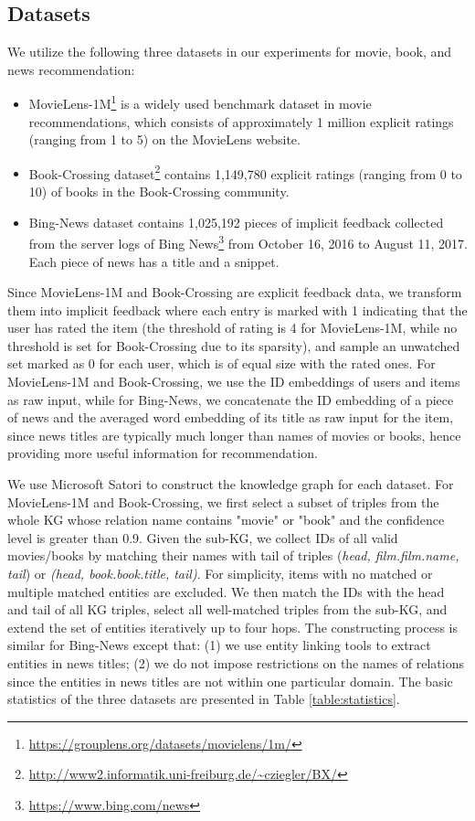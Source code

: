 \documentclass[sigconf]{acmart}
\begin{document}
	
	\subsection{Datasets}
		We utilize the following three datasets in our experiments for movie, book, and news recommendation:
		\begin{itemize}
			\item
				MovieLens-1M\footnote{\url{https://grouplens.org/datasets/movielens/1m/}} is a widely used benchmark dataset in movie recommendations, which consists of approximately 1 million explicit ratings (ranging from 1 to 5) on the MovieLens website.
\item
				Book-Crossing dataset\footnote{\url{http://www2.informatik.uni-freiburg.de/~cziegler/BX/}} contains 1,149,780 explicit ratings (ranging from 0 to 10) of books in the Book-Crossing community.
\item
				Bing-News dataset contains 1,025,192 pieces of implicit feedback collected from the server logs of Bing News\footnote{\url{https://www.bing.com/news}} from October 16, 2016 to August 11, 2017.
				Each piece of news has a title and a snippet.
		\end{itemize}
		
		Since MovieLens-1M and Book-Crossing are explicit feedback data, we transform them into implicit feedback where each entry is marked with 1 indicating that the user has rated the item (the threshold of rating is 4 for MovieLens-1M, while no threshold is set for Book-Crossing due to its sparsity), and sample an unwatched set marked as 0 for each user, which is of equal size with the rated ones.
For MovieLens-1M and Book-Crossing, we use the ID embeddings of users and items as raw input, while for Bing-News, we concatenate the ID embedding of a piece of news and the averaged word embedding of its title as raw input for the item, since news titles are typically much longer than names of movies or books, hence providing more useful information for recommendation.
		
		
		We use Microsoft Satori to construct the knowledge graph for each dataset.
		For MovieLens-1M and Book-Crossing, we first select a subset of triples from the whole KG whose relation name contains "movie" or "book" and the confidence level is greater than 0.9.
		Given the sub-KG, we collect IDs of all valid movies/books by matching their names with tail of triples (\textit{head, film.film.name, tail}) or \textit{(head, book.book.title, tail)}.
		For simplicity, items with no matched or multiple matched entities are excluded.
		We then match the IDs with the head and tail of all KG triples, select all well-matched triples from the sub-KG, and extend the set of entities iteratively up to four hops.
		The constructing process is similar for Bing-News except that: (1) we use entity linking tools to extract entities in news titles; (2) we do not impose restrictions on the names of relations since the entities in news titles are not within one particular domain.
		The basic statistics of the three datasets are presented in Table \ref{table:statistics}.
		
\end{document}
